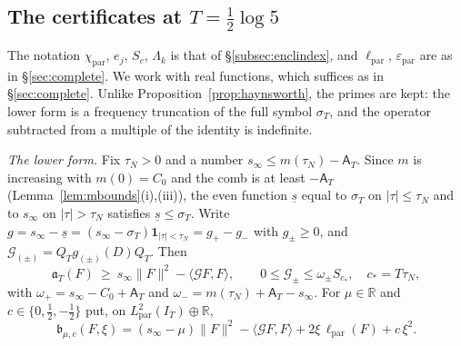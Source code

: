 \documentclass[11pt]{amsart}
\theoremstyle{definition}
\theoremstyle{remark}
\newcommand{\R}{\mathbb R}
\newcommand{\IT}{I_T}
\newcommand{\sT}{\sigma_T}
\newcommand{\Aconst}{\mathsf A_T}
\begin{document}
\subsection{The certificates at \texorpdfstring{$T=\frac12\log5$}{T = (1/2) log 5}}\label{subsec:encllog5}
The notation $\chi_{\mathrm{par}}$, $e_j$, $S_c$, $\Lambda_k$ is that of \S\ref{subsec:enclindex}, and
$\ell_{\mathrm{par}}$, $\varepsilon_{\mathrm{par}}$ are as in \S\ref{sec:complete}. We work with real functions,
which suffices as in \S\ref{sec:complete}. Unlike Proposition~\ref{prop:haynsworth}, the primes are kept:
the lower form is a frequency truncation of the full symbol $\sT$, and the operator subtracted from a
multiple of the identity is indefinite.

\emph{The lower form.} Fix $\tau_N>0$ and a number $s_\infty\le m(\tau_N)-\Aconst$. Since $m$ is increasing
with $m(0)=C_0$ and the comb is at least $-\Aconst$ (Lemma~\ref{lem:mbounds}(i),(iii)), the even function
$\underline s$ equal to $\sT$ on $|\tau|\le\tau_N$ and to $s_\infty$ on $|\tau|>\tau_N$ satisfies
$\underline s\le\sT$. Write $g=s_\infty-\underline s=(s_\infty-\sT)\mathbf 1_{|\tau|<\tau_N}=g_+-g_-$ with
$g_\pm\ge0$, and $\mathcal G_{(\pm)}=Q_Tg_{(\pm)}(D)Q_T$. Then
\[
\mathfrak a_T(F)\ \ge\ s_\infty\|F\|^2-\langle\mathcal GF,F\rangle,\qquad
0\le\mathcal G_\pm\le\omega_\pm S_{c_*},\quad c_*=T\tau_N,
\]
with $\omega_+=s_\infty-C_0+\Aconst$ and $\omega_-=m(\tau_N)+\Aconst-s_\infty$. For $\mu\in\R$ and
$c\in\{0,\frac12,-\frac12\}$ put, on $L^2_{\mathrm{par}}(\IT)\oplus\R$,
\[
\mathfrak b_{\mu,c}(F,\xi)=(s_\infty-\mu)\|F\|^2-\langle\mathcal GF,F\rangle+2\xi\,\ell_{\mathrm{par}}(F)+c\,\xi^2 .
\]
\end{document}
